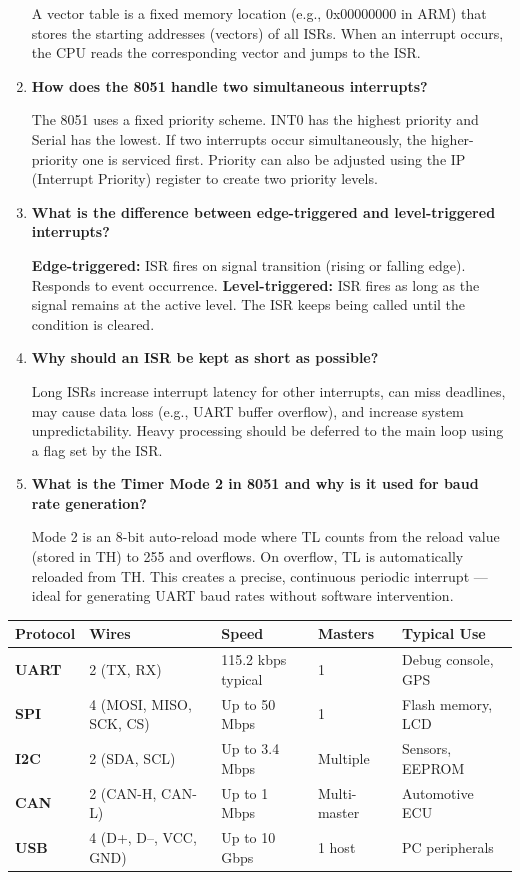 \documentclass[12pt,a4paper]{article}
\newcommand{\Q}[1]{\textbf{#1}\par\noindent\ignorespaces}
\renewcommand{\arraystretch}{1.45}
\begin{document}
\begin{tcolorbox}[exambox, title={\textbf{Frequently Asked / Viva Questions}}]
\begin{enumerate}[topsep=0pt, label=\textbf{Q\arabic*.}, itemsep=5pt]
    A vector table is a fixed memory location (e.g., 0x00000000 in ARM) that stores the starting addresses (vectors) of all ISRs. When an interrupt occurs, the CPU reads the corresponding vector and jumps to the ISR.
  \item \Q{How does the 8051 handle two simultaneous interrupts?}
    The 8051 uses a fixed priority scheme. INT0 has the highest priority and Serial has the lowest. If two interrupts occur simultaneously, the higher-priority one is serviced first. Priority can also be adjusted using the IP (Interrupt Priority) register to create two priority levels.
  \item \Q{What is the difference between edge-triggered and level-triggered interrupts?}
    \textbf{Edge-triggered:} ISR fires on signal transition (rising or falling edge). Responds to event occurrence. \textbf{Level-triggered:} ISR fires as long as the signal remains at the active level. The ISR keeps being called until the condition is cleared.
  \item \Q{Why should an ISR be kept as short as possible?}
    Long ISRs increase interrupt latency for other interrupts, can miss deadlines, may cause data loss (e.g., UART buffer overflow), and increase system unpredictability. Heavy processing should be deferred to the main loop using a flag set by the ISR.
  \item \Q{What is the Timer Mode 2 in 8051 and why is it used for baud rate generation?}
    Mode 2 is an 8-bit auto-reload mode where TL counts from the reload value (stored in TH) to 255 and overflows. On overflow, TL is automatically reloaded from TH. This creates a precise, continuous periodic interrupt --- ideal for generating UART baud rates without software intervention.
\end{enumerate}
\end{tcolorbox}

\begin{tcolorbox}[tikzbox, title={Serial Communication Protocols at a Glance}]
\par\noindent
{\renewcommand{\arraystretch}{1.55}%
\begin{tabularx}{\linewidth}{|B{2.5cm}|Y|Y|Y|Y|}
\hline
\textbf{Protocol} & \textbf{Wires} & \textbf{Speed} & \textbf{Masters} & \textbf{Typical Use} \\
\hline
\textbf{UART} & 2 (TX, RX) & 115.2 kbps typical & 1 & Debug console, GPS \\
\hline
\textbf{SPI} & 4 (MOSI, MISO, SCK, CS) & Up to 50 Mbps & 1 & Flash memory, LCD \\
\hline
\textbf{I2C} & 2 (SDA, SCL) & Up to 3.4 Mbps & Multiple & Sensors, EEPROM \\
\hline
\textbf{CAN} & 2 (CAN-H, CAN-L) & Up to 1 Mbps & Multi-master & Automotive ECU \\
\hline
\textbf{USB} & 4 (D+, D--, VCC, GND) & Up to 10 Gbps & 1 host & PC peripherals \\
\hline
\end{tabularx}}
\end{tcolorbox}
\end{document}
